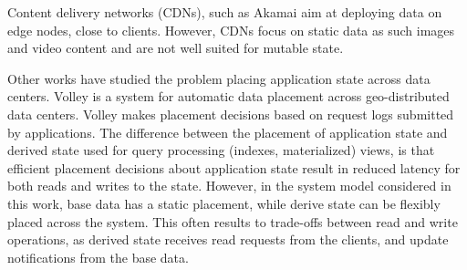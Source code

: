 Content delivery networks (CDNs), such as Akamai \cite{nygren:akamai} aim at deploying data on edge nodes,
close to clients.
However, CDNs focus on static data as such images and video content and are not well suited for mutable state.

Other works have studied the problem placing application state across data centers.
Volley \cite{agarwal:volley} is a system for automatic data placement across geo-distributed data centers.
Volley makes placement decisions based on request logs submitted by applications.
The difference between the placement of application state and derived state used for query processing (indexes, materialized)
views, is that efficient placement decisions about application state result in reduced latency for both reads and writes
to the state.
However, in the system model considered in this work, base data has a static placement,
while derive state can be flexibly placed across the system.
This often results to trade-offs between read and write operations,
as derived state receives read requests from the clients, and update notifications from the base data.




